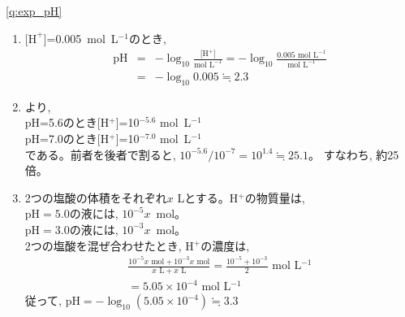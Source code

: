 \ref{q:exp_pH} 
\begin{enumerate}
\item $\text{[H}^+\text{]}$=0.005~mol~L$^{-1}$のとき, 
\begin{eqnarray*}
\text{pH}&=&-\log_{10}\frac{\text{[H$^+$]}}{\text{mol~L}^{-1}}=-\log_{10} \frac{0.005\,\,\text{mol~L}^{-1}}{\text{mol~L}^{-1}}\\
&=&-\log_{10} 0.005\fallingdotseq 2.3
\end{eqnarray*}
\item {}より, \\
pH=5.6のとき[H$^+$]=10$^{-5.6}$ mol~L$^{-1}$\\
pH=7.0のとき[H$^+$]=10$^{-7.0}$ mol~L$^{-1}$\\
である。前者を後者で割ると, $10^{-5.6}/10^{-7}=10^{1.4}\fallingdotseq25.1$。
すなわち, 約25倍。
\item 2つの塩酸の体積をそれぞれ$x$ Lとする。H$^{+}$の物質量は, \\
       pH$=5.0$の液には, $10^{-5}x$~mol。\\
       pH$=3.0$の液には, $10^{-3}x$~mol。\\
       2つの塩酸を混ぜ合わせたとき, H$^{+}$の濃度は,
\begin{eqnarray*}
\frac{10^{-5}x\text{ mol}+10^{-3}x\text{ mol}}{x\text{ L}+x\text{ L}}=\frac{10^{-5}+10^{-3}}{2}\text{ mol~L$^{-1}$}\\
=5.05 \times 10^{-4} \text{ mol~L$^{-1}$}
\end{eqnarray*}
従って, pH$=-\log_{10} (5.05 \times 10^{-4}) \fallingdotseq 3.3$
\end{enumerate}

